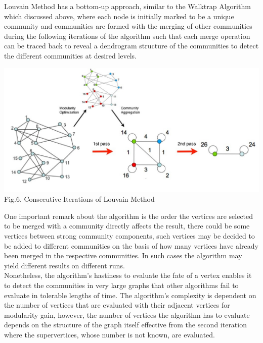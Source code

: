 \documentclass[10pt]{article}
\begin{document}
Louvain Method has a bottom-up approach, similar to the Walktrap Algorithm which discussed above, where each node is initially marked to be a unique community and communities are formed with the merging of other communities during the following iterations of the algorithm such that each merge operation can be traced back to reveal a dendrogram structure of the communities to detect the different communities at desired levels. \\

\begin{center}
    \includegraphics[scale=0.35]{louvain.jpg} \\
    Fig.6. Consecutive Iterations of Louvain Method\cite{blondel} \\
\end{center}

One important remark about the algorithm is the order the vertices are selected to be merged with a community directly affects the result, there could be some vertices between strong community components, such vertices may be decided to be added to different communities on the basis of how many vertices have already been merged in the respective communities. In such cases the algorithm may yield different results on different runs. \\

Nonetheless, the algorithm’s hastiness to evaluate the fate of a vertex enables it to detect the communities in very large graphs that other algorithms fail to evaluate in tolerable lengths of time. The algorithm’s complexity is dependent on the number of vertices that are evaluated with their adjacent vertices for modularity gain, however, the number of vertices the algorithm has to evaluate depends on the structure of the graph itself effective from the second iteration where the supervertices, whose number is not known, are evaluated. \\
\end{document}
